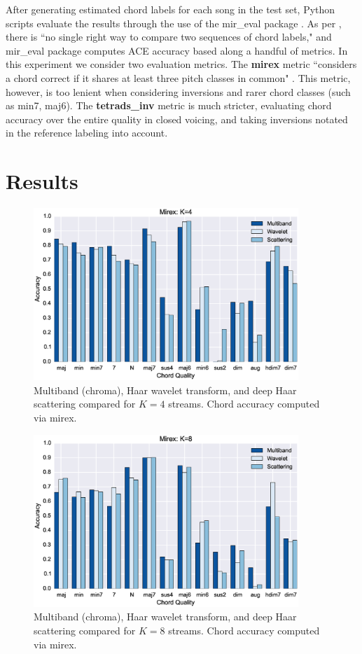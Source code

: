 \documentclass{article}
\begin{document}
After generating estimated chord labels for each song in the test set, Python scripts evaluate the results through the use of the mir\_eval package \cite{raffel2014mir}.
As per \cite{raffel2014mir}, there is ``no single right way to compare two sequences of chord labels,"
and mir\_eval package computes ACE accuracy based along a handful of metrics.
In this experiment we consider two evaluation metrics. The \textbf{mirex} metric ``considers a chord
correct if it shares at least three pitch classes in common" \cite{raffel2014mir}. This metric, however, is too lenient when considering inversions and rarer chord classes (such as min7, maj6). The \textbf{tetrads\_inv} metric is much stricter, evaluating chord accuracy over the entire quality in closed voicing, and taking inversions notated in the reference labeling into account.
	
\section{Results}\label{sec:results}

\begin{figure}
 \centerline{
 \includegraphics[width=10cm]{figs/mirex4.eps}}
 \caption{Multiband (chroma), Haar wavelet transform, and deep Haar scattering compared for $K=4$ streams. Chord accuracy computed via mirex.}
 \label{fig:mirex4}
\end{figure}

\begin{figure}
 \centerline{
 \includegraphics[width=10cm]{figs/mirex8.eps}}
 \caption{Multiband (chroma), Haar wavelet transform, and deep Haar scattering compared for $K=8$ streams. Chord accuracy computed via mirex.}
 \label{fig:mirex8}
\end{figure}
\end{document}
